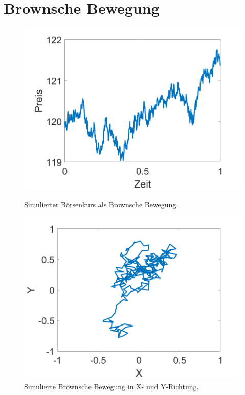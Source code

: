%
%
%
%

\section{Brownsche Bewegung\label{brown:BrownBewegung}}


\begin{figure}
	\centering
	\begin{minipage}{0.45\textwidth}
		\centering
		\includegraphics[width=\linewidth]{papers/brown/images/boersenKurs-simuliert.png}
		\caption{Simulierter Börsenkurs als Brownsche Bewegung.}
		\label{brown:1Dbrownian}
	\end{minipage}
	\hspace{0.05\linewidth}
	\begin{minipage}{0.45\textwidth}
		\centering
		\includegraphics[width=\linewidth]{papers/brown/images/brownscheBewegung-simuliert.png}
		\caption{Simulierte Brownsche Bewegung in X- und Y-Richtung.}
		\label{brown:2Dbrownian}
	\end{minipage}
\end{figure}


